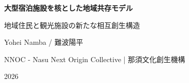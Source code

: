 \documentclass[12pt,a4paper]{article}
\begin{document}
\begin{titlepage}
\centering
\vspace*{28mm}

{\LARGE\bfseries 大型宿泊施設を核とした地域共存モデル\par}
\vspace{6mm}
{\Large 地域住民と観光施設の新たな相互創生構造\par}

\vspace{28mm}

{\large Yohei Namba / 難波陽平\par}
\vspace{4mm}
{\large NNOC - Nasu Next Origin Collective | 那須文化創生機構\par}

\vfill

{\large 2026\par}

\end{titlepage}

\tableofcontents
\newpage


\newpage


\newpage


\newpage


\newpage


\newpage


\newpage


\newpage


\end{document}
